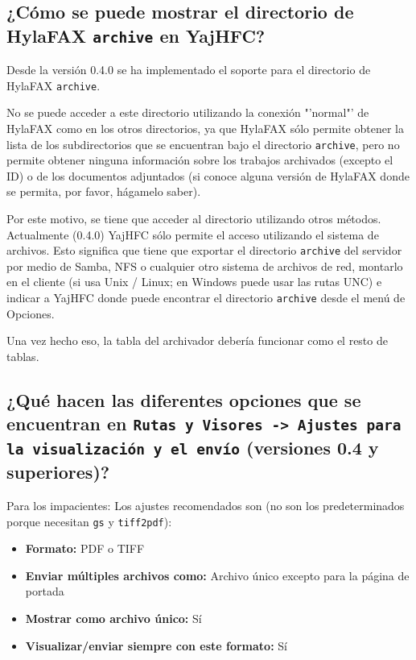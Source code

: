 \documentclass[a4paper,10pt]{scrartcl}
\begin{document}
\subsection{¿Cómo se puede mostrar el directorio de HylaFAX \texttt{archive} en YajHFC?}

Desde la versión 0.4.0 se ha implementado el soporte para el directorio de HylaFAX \texttt{archive}.

No se puede acceder a este directorio utilizando la conexión "'normal"' de HylaFAX como en los otros directorios, ya que HylaFAX sólo permite obtener la lista de los subdirectorios que se encuentran bajo el directorio \texttt{archive}, pero no permite obtener ninguna información sobre los trabajos archivados (excepto el ID) o de los documentos adjuntados (si conoce alguna versión de HylaFAX donde se permita, por favor, hágamelo saber).

Por este motivo, se tiene que acceder al directorio utilizando otros métodos. Actualmente (0.4.0) YajHFC sólo permite el acceso utilizando el sistema de archivos. Esto significa que tiene que exportar el directorio \texttt{archive} del servidor por medio de Samba, NFS o cualquier otro sistema de archivos de red, montarlo en el cliente (si usa Unix / Linux; en Windows puede usar las rutas UNC) e indicar a YajHFC donde puede encontrar el directorio \texttt{archive} desde el menú de Opciones.

Una vez hecho eso, la tabla del archivador debería funcionar como el resto de tablas.

\subsection{¿Qué hacen las diferentes opciones que se encuentran en \texttt{Rutas y Visores ->\ Ajustes para la visualización y el envío} (versiones 0.4 y superiores)?}

Para los impacientes: Los ajustes recomendados son (no son los predeterminados porque necesitan \texttt{gs} y \texttt{tiff2pdf}):
\begin{itemize}
 \item \textbf{Formato:} PDF o TIFF
 \item \textbf{Enviar múltiples archivos como:} Archivo único excepto para la página de portada
 \item \textbf{Mostrar como archivo único:} Sí
 \item \textbf{Visualizar/enviar siempre con este formato:} Sí
\end{itemize}
\end{document}

